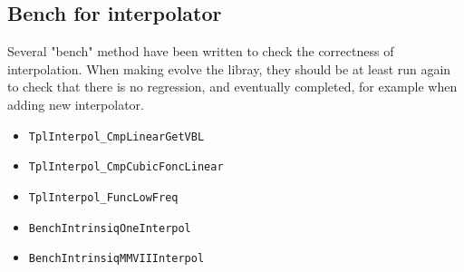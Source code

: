 
\subsection{Bench for interpolator}

Several "bench" method have been written to check the correctness of interpolation. When making evolve the
libray, they should be at least run again to check that there is no regression, and eventually completed,
for example when adding new interpolator.

\begin{itemize}
     \item {\tt TplInterpol\_CmpLinearGetVBL}
     \item {\tt TplInterpol\_CmpCubicFoncLinear}
     \item {\tt TplInterpol\_FuncLowFreq}
     \item {\tt BenchIntrinsiqOneInterpol}
     \item {\tt BenchIntrinsiqMMVIIInterpol}
\end{itemize}







